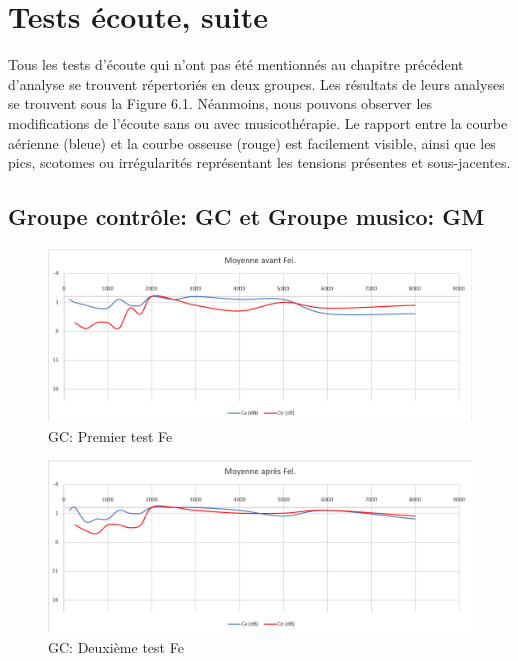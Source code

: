 \section{Tests écoute, suite }

Tous les  tests d'écoute qui n'ont pas été mentionnés au chapitre précédent d'analyse  se trouvent 
répertoriés
en deux groupes. Les résultats de leurs analyses se trouvent sous la Figure  6.1.
Néanmoins, nous pouvons observer les modifications de l'écoute sans ou avec musicothérapie.
Le rapport entre la courbe aérienne (bleue) et la courbe osseuse (rouge) est facilement visible, ainsi que 
les pics, scotomes ou irrégularités représentant les tensions présentes et sous-jacentes.
 \subsection*{Groupe contrôle: GC  et Groupe musico: GM}
 
  \begin{figure}[th]
 	\centering
 	\includegraphics[width=1\linewidth]{images/graphiques/moyavFEL.png}
 	\caption[GC: Patient Fe: 1° test]{GC: Premier test Fe}
 \end{figure}
 \begin{figure}[th]
 	\centering
 	\includegraphics[width=1\linewidth]{images/graphiques/moyaprFEL.png}
 	\caption[GC: Patient Fe: 2° test]{GC: Deuxième test Fe}
 \end{figure}
 
